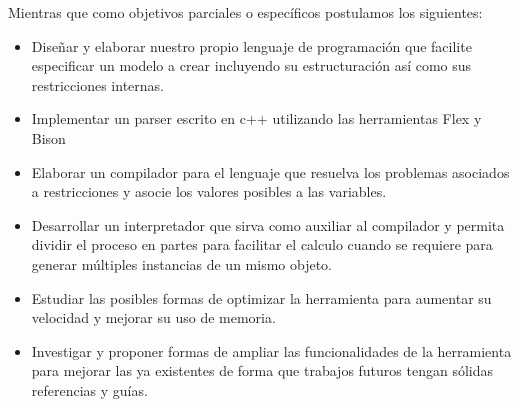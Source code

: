 \label{sect:objetivos}
Mientras que como objetivos parciales o específicos postulamos los siguientes:
\begin{itemize}
\item {Diseñar y elaborar nuestro propio lenguaje de programación que facilite especificar un 
modelo a crear incluyendo su estructuración así como sus restricciones internas.}
\item Implementar un parser escrito en c++ utilizando las herramientas Flex y Bison
\item Elaborar un compilador para el lenguaje que resuelva los problemas asociados a restricciones
y asocie los valores posibles a las variables.
\item {Desarrollar un interpretador que sirva como auxiliar al compilador y permita dividir
el proceso en partes para facilitar el calculo cuando se requiere para generar múltiples
instancias de un mismo objeto.}
\item {Estudiar las posibles formas de optimizar la herramienta para aumentar su velocidad y
mejorar su uso de memoria.}
\item {Investigar y proponer formas de ampliar las funcionalidades de la herramienta para mejorar las
ya existentes de forma que trabajos futuros tengan sólidas referencias y guías.} 
\end{itemize}